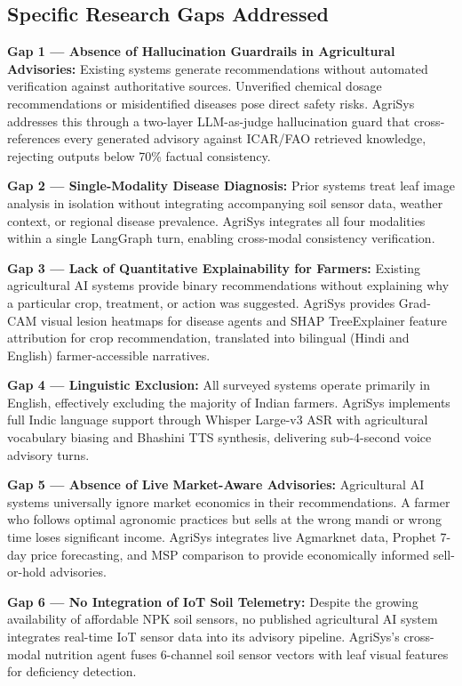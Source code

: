 \documentclass[12pt,a4paper]{article}
\begin{document}
\subsection{Specific Research Gaps Addressed}

\textbf{Gap 1 --- Absence of Hallucination Guardrails in Agricultural Advisories:}
Existing systems generate recommendations without automated verification against authoritative sources. Unverified chemical dosage recommendations or misidentified diseases pose direct safety risks. AgriSys addresses this through a two-layer LLM-as-judge hallucination guard that cross-references every generated advisory against ICAR/FAO retrieved knowledge, rejecting outputs below 70\% factual consistency.

\textbf{Gap 2 --- Single-Modality Disease Diagnosis:}
Prior systems treat leaf image analysis in isolation without integrating accompanying soil sensor data, weather context, or regional disease prevalence. AgriSys integrates all four modalities within a single LangGraph turn, enabling cross-modal consistency verification.

\textbf{Gap 3 --- Lack of Quantitative Explainability for Farmers:}
Existing agricultural AI systems provide binary recommendations without explaining why a particular crop, treatment, or action was suggested. AgriSys provides Grad-CAM visual lesion heatmaps for disease agents and SHAP TreeExplainer feature attribution for crop recommendation, translated into bilingual (Hindi and English) farmer-accessible narratives.

\textbf{Gap 4 --- Linguistic Exclusion:}
All surveyed systems operate primarily in English, effectively excluding the majority of Indian farmers. AgriSys implements full Indic language support through Whisper Large-v3 ASR with agricultural vocabulary biasing and Bhashini TTS synthesis, delivering sub-4-second voice advisory turns.

\textbf{Gap 5 --- Absence of Live Market-Aware Advisories:}
Agricultural AI systems universally ignore market economics in their recommendations. A farmer who follows optimal agronomic practices but sells at the wrong mandi or wrong time loses significant income. AgriSys integrates live Agmarknet data, Prophet 7-day price forecasting, and MSP comparison to provide economically informed sell-or-hold advisories.

\textbf{Gap 6 --- No Integration of IoT Soil Telemetry:}
Despite the growing availability of affordable NPK soil sensors, no published agricultural AI system integrates real-time IoT sensor data into its advisory pipeline. AgriSys's cross-modal nutrition agent fuses 6-channel soil sensor vectors with leaf visual features for deficiency detection.
\end{document}

